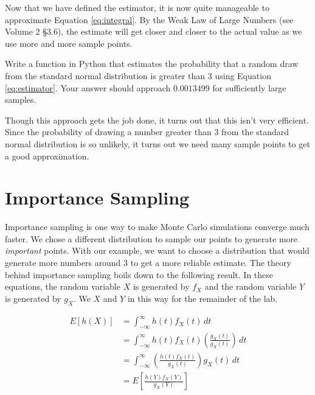 Now that we have defined the estimator, it is now quite manageable to approximate Equation \ref{eq:integral}. By the Weak Law of Large Numbers (see Volume 2 \S 3.6), the estimate will get closer and closer to the actual value as we use more and more sample points.

\begin{problem} \label{prob:mc}
Write a function in Python that estimates the probability that a random draw from the standard normal distribution is greater than 3 using Equation \ref{eq:estimator}. Your answer should approach $0.0013499$ for sufficiently large samples.
\end{problem}

Though this approach gets the job done, it turns out that this isn't very efficient. Since the probability of drawing a number greater than $3$ from the standard normal distribution is so unlikely, it turns out we need many sample points to get a good approximation.

\section*{Importance Sampling}
Importance sampling is one way to make Monte Carlo simulations converge much faster. We chose a different distribution to sample our points to generate more \emph{important} points. With our example, we want to choose a distribution that would generate more numbers around $3$ to get a more reliable estimate. The theory behind importance sampling boils down to the following result. In these equations, the random variable $X$ is generated by $f_X$ and the random variable $Y$ is generated by $g_X$. We $X$ and $Y$ in this way for the remainder of the lab.

\begin{equation} \label{eq:importance}
\begin{split}
E[h(X)] & = \int_{-\infty}^{\infty} h(t)f_X(t)\,dt \\
& = \int_{-\infty}^{\infty} h(t)f_X(t)\left ( \frac{g_X(t)}{g_X(t)} \right )\,dt \\
& = \int_{-\infty}^{\infty} \left ( \frac{h(t)f_X(t)}{g_X(t)} \right )g_X(t)\,dt \\
& = E\left [ \frac{h(Y)f_X(Y)}{g_X(Y)}\right ]
\end{split}
\end{equation}

